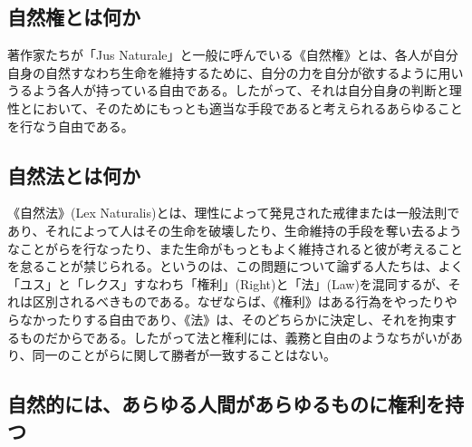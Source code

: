 





\subsection{自然権とは何か}

著作家たちが「Jus Naturale」と一般に呼んでいる《自然権》とは、各人が自分自身の自然すなわち生命を維持するために、自分の力を自分が欲するように用いうるよう各人が持っている自由である。したがって、それは自分自身の判断と理性とにおいて、そのためにもっとも適当な手段であると考えられるあらゆることを行なう自由である。



\subsection{自然法とは何か}


《自然法》(Lex Naturalis)とは、理性によって発見された戒律または一般法則であり、それによって人はその生命を破壊したり、生命維持の手段を奪い去るようなことがらを行なったり、また生命がもっともよく維持されると彼が考えることを怠ることが禁じられる。というのは、この問題について論ずる人たちは、よく「ユス」と「レクス」すなわち「権利」(Right)と「法」(Law)を混同するが、それは区別されるべきものである。なぜならば、《権利》はある行為をやったりやらなかったりする自由であり、《法》は、そのどちらかに決定し、それを拘束するものだからである。したがって法と権利には、義務と自由のようなちがいがあり、同一のことがらに関して勝者が一致することはない。

\subsection{自然的には、あらゆる人間があらゆるものに権利を持つ}


